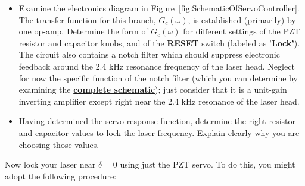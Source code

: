 \documentclass{../lab}
\begin{document}
\begin{itemize}
    \item Examine the electronics diagram in Figure~\ref{fig:SchematicOfServoController}. The transfer function for this branch, $G_c(\omega)$, is established (primarily) by one op-amp. Determine the form of $G_c(\omega)$ for different settings of the PZT resistor and capacitor knobs, and of the \textbf{RESET} switch (labeled as '\textbf{Lock'}). The circuit also contains a notch filter which should suppress electronic feedback around the 2.4 kHz resonance frequency of the laser head. Neglect for now the specific function of the notch filter (which you can determine by examining the \href{http://experimentationlab.berkeley.edu/sites/default/files/images/Full\_schematic.pdf}{\textbf{complete schematic}}); just consider that it is a unit-gain inverting amplifier except right near the 2.4 kHz resonance of the laser head.

    \item Having determined the servo response function, determine the right resistor and capacitor values to lock the laser frequency. Explain clearly why you are choosing those values.
\end{itemize}

Now lock your laser near $\delta = 0$ using just the PZT servo. To do this, you might adopt the following procedure:
\end{document}
